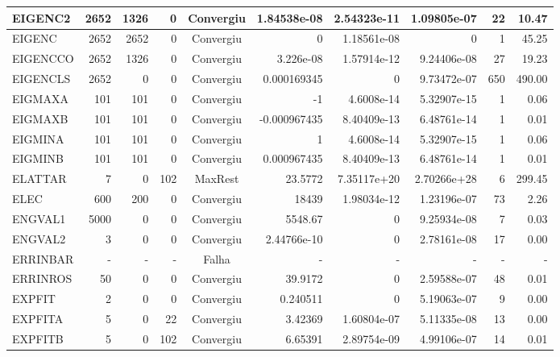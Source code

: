 \begin{center}
\begin{longtable}{|l|r|r|r|c|r|r|r|r|r|}
 EIGENC2 &   2652 &   1326 &      0 & Convergiu  & 1.84538e-08 &    2.54323e-11 & 1.09805e-07 &     22 &   10.47 \\ \hline
  EIGENC &   2652 &   2652 &      0 & Convergiu  &           0 &    1.18561e-08 &           0 &      1 &   45.25 \\ \hline
EIGENCCO &   2652 &   1326 &      0 & Convergiu  &   3.226e-08 &    1.57914e-12 & 9.24406e-08 &     27 &   19.23 \\ \hline
EIGENCLS &   2652 &      0 &      0 & Convergiu  & 0.000169345 &              0 & 9.73472e-07 &    650 &  490.00 \\ \hline
 EIGMAXA &    101 &    101 &      0 & Convergiu  &          -1 &     4.6008e-14 & 5.32907e-15 &      1 &    0.06 \\ \hline
 EIGMAXB &    101 &    101 &      0 & Convergiu  & -0.000967435 &    8.40409e-13 & 6.48761e-14 &      1 &    0.01 \\ \hline
 EIGMINA &    101 &    101 &      0 & Convergiu  &           1 &     4.6008e-14 & 5.32907e-15 &      1 &    0.06 \\ \hline
 EIGMINB &    101 &    101 &      0 & Convergiu  & 0.000967435 &    8.40409e-13 & 6.48761e-14 &      1 &    0.01 \\ \hline
 ELATTAR &      7 &      0 &    102 & MaxRest    &     23.5772 &    7.35117e+20 & 2.70266e+28 &      6 &  299.45 \\ \hline
    ELEC &    600 &    200 &      0 & Convergiu  &       18439 &    1.98034e-12 & 1.23196e-07 &     73 &    2.26 \\ \hline
 ENGVAL1 &   5000 &      0 &      0 & Convergiu  &     5548.67 &              0 & 9.25934e-08 &      7 &    0.03 \\ \hline
 ENGVAL2 &      3 &      0 &      0 & Convergiu  & 2.44766e-10 &              0 & 2.78161e-08 &     17 &    0.00 \\ \hline
ERRINBAR & - & - & - & Falha & - & - & - & - & - \\ \hline
ERRINROS &     50 &      0 &      0 & Convergiu  &     39.9172 &              0 & 2.59588e-07 &     48 &    0.01 \\ \hline
  EXPFIT &      2 &      0 &      0 & Convergiu  &    0.240511 &              0 & 5.19063e-07 &      9 &    0.00 \\ \hline
 EXPFITA &      5 &      0 &     22 & Convergiu  &     3.42369 &    1.60804e-07 & 5.11335e-08 &     13 &    0.00 \\ \hline
 EXPFITB &      5 &      0 &    102 & Convergiu  &     6.65391 &    2.89754e-09 & 4.99106e-07 &     14 &    0.01 \\ \hline

\end{longtable}
\end{center}

